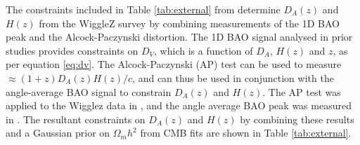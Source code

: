 \documentclass[titlesmallcaps, examinerscopy, copyrightpage]{uqthesis}
\begin{document}
The constraints included in Table \ref{tab:external} from \citet{BlakeBroughColless2012} determine $D_A(z)$ and $H(z)$ from the WiggleZ survey by combining measurements of the 1D BAO peak and the Alcock-Paczynski distortion. The 1D BAO signal analysed in prior studies provides constraints on $D_V$, which is a function of $D_A$, $H(z)$ and $z$, as per equation \eqref{eq:dv}. The  Alcock-Paczynski (AP) test can be used to measure $\approx (1+z)D_A(z) H(z)/c$, and can thus be used in conjunction with the angle-average BAO signal to constrain $D_A(z)$ and $H(z)$. The AP test was applied to the Wigglez data in \citet{BlakeGlazebrook2011}, and the angle average BAO peak was measured in \citet{BlakeKazin2011}. The resultant constraints on $D_A(z)$ and $H(z)$ by combining these results and a Gaussian prior on $\Omega_m h^2$ from CMB fits \citep{Komatsu2009} are shown in Table \ref{tab:external}.




\begin{table}[h]
\centering
\caption{External constraints on $D_A(z)$ and $H(z)$.}
\end{table}
\end{document}
